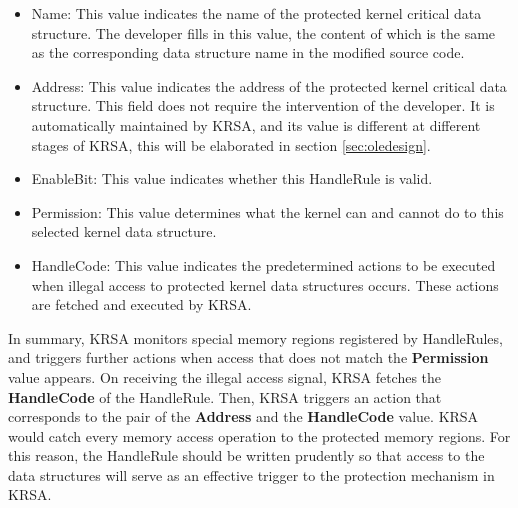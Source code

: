 \documentclass[conference]{IEEEtran}
\begin{document}
\begin{itemize}
\item Name: This value indicates the name of the protected kernel critical data structure. The developer fills in this value, the content of which is the same as the corresponding data structure name in the modified source code. 
\item Address: This value indicates the address of the protected kernel critical data structure. This field does not require the intervention of the developer. It is automatically maintained by KRSA, and its value is different at different stages of KRSA, this will be elaborated in section \ref{sec:oledesign}. 
\item EnableBit: This value indicates whether this HandleRule is valid. 
\item Permission: This value determines what the kernel can and cannot do to this selected kernel data structure. 
\item HandleCode: This value indicates the predetermined actions to be executed when illegal access to protected kernel data structures occurs. These actions are fetched and executed by KRSA. 
\end{itemize}

In summary, KRSA monitors special memory regions registered by HandleRules, and triggers further actions when access that does not match the \textbf{Permission} value appears. On receiving the illegal access signal, KRSA fetches the \textbf{HandleCode} of the HandleRule. Then, KRSA triggers an action that corresponds to the pair of the \textbf{Address} and the \textbf{HandleCode} value. 
KRSA would catch every memory access operation to the protected memory regions. For this reason, the HandleRule should be written prudently so that access to the data structures will serve as an effective trigger to the protection mechanism in KRSA.

\end{document}

